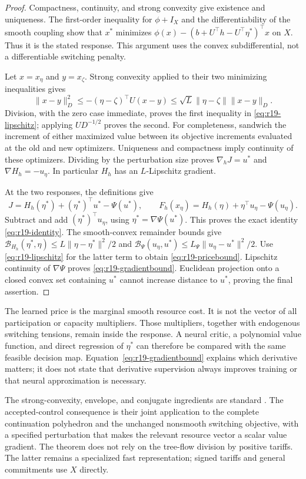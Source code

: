 \begin{proof}
Compactness, continuity, and strong convexity give existence and uniqueness. The first-order inequality for $\phi+I_X$ and the differentiability of the smooth coupling show that $x^*$ minimizes $\phi(x)-(b+U^\top h- U^\top\eta^*)^\top x$ on $X$. Thus it is the stated response. This argument uses the convex subdifferential, not a differentiable switching penalty.

Let $x=x_\eta$ and $y=x_\zeta$. Strong convexity applied to their two minimizing inequalities gives
\[
 \|x-y\|_D^2\leq-(\eta-\zeta)^\top U(x-y)
 \leq\sqrt L\|\eta-\zeta\|\|x-y\|_D.
\]
Division, with the zero case immediate, proves the first inequality in \eqref{eq:r19-lipschitz}; applying $UD^{-1/2}$ proves the second. For completeness, sandwich the increment of either maximized value between its objective increments evaluated at the old and new optimizers. Uniqueness and compactness imply continuity of these optimizers. Dividing by the perturbation size proves $\nabla_hJ=u^*$ and $\nabla H_h=-u_\eta$. In particular $H_h$ has an $L$-Lipschitz gradient.

At the two responses, the definitions give
\[
 J=H_h(\eta^*)+(\eta^*)^\top u^*-\Psi(u^*),\qquad
 F_h(x_\eta)=H_h(\eta)+\eta^\top u_\eta-\Psi(u_\eta).
\]
Subtract and add $(\eta^*)^\top u_\eta$, using $\eta^*=\nabla\Psi(u^*)$. This proves the exact identity \eqref{eq:r19-identity}. The smooth-convex remainder bounds give
$\mathcal B_{H_h}(\eta^*,\eta)\leq L\|\eta-\eta^*\|^2/2$ and
$\mathcal B_\Psi(u_\eta,u^*)\leq L_\Psi\|u_\eta-u^*\|^2/2$.
Use \eqref{eq:r19-lipschitz} for the latter term to obtain \eqref{eq:r19-pricebound}. Lipschitz continuity of $\nabla\Psi$ proves \eqref{eq:r19-gradientbound}. Euclidean projection onto a closed convex set containing $u^*$ cannot increase distance to $u^*$, proving the final assertion.
\end{proof}
The learned price is the marginal smooth resource cost. It is not the vector of all participation or capacity multipliers. Those multipliers, together with endogenous switching tensions, remain inside the response. A neural critic, a polynomial value function, and direct regression of $\eta^*$ can therefore be compared with the same feasible decision map. Equation~\eqref{eq:r19-gradientbound} explains which derivative matters; it does not state that derivative supervision always improves training or that neural approximation is necessary.

The strong-convexity, envelope, and conjugate ingredients are standard \citep{BoydVandenberghe2004}. The accepted-control consequence is their joint application to the complete continuation polyhedron and the unchanged nonsmooth switching objective, with a specified perturbation that makes the relevant resource vector a scalar value gradient. The theorem does not rely on the tree-flow division by positive tariffs. The latter remains a specialized fast representation; signed tariffs and general commitments use $X$ directly.

